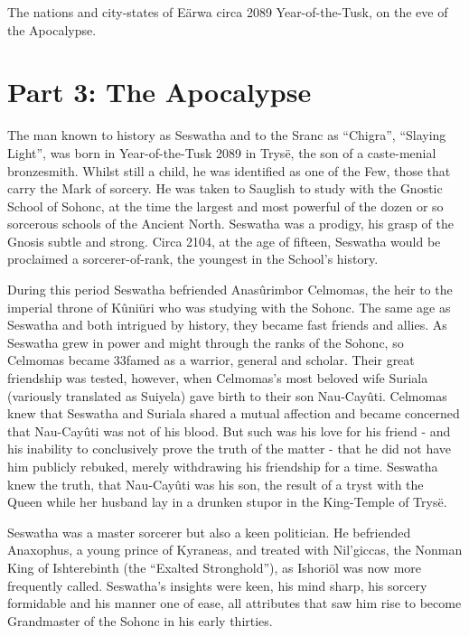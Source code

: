 \documentclass[]{book}
\begin{document}
The nations and city-states of Eärwa circa 2089 Year-of-the-Tusk, on the eve of the Apocalypse.

\hypertarget{part-3-the-apocalypse}{%
\chapter{Part 3: The Apocalypse}\label{part-3-the-apocalypse}}

The man known to history as Seswatha and to the Sranc as ``Chigra'', ``Slaying Light'',
was born in Year-of-the-Tusk 2089 in Trysë, the son of a caste-menial bronzesmith.
Whilst still a child, he was identified as one of the Few, those that carry the Mark of
sorcery. He was taken to Sauglish to study with the Gnostic School of Sohonc, at the
time the largest and most powerful of the dozen or so sorcerous schools of the Ancient
North. Seswatha was a prodigy, his grasp of the Gnosis subtle and strong. Circa 2104,
at the age of fifteen, Seswatha would be proclaimed a sorcerer-of-rank, the youngest in
the School's history.

During this period Seswatha befriended Anasûrimbor Celmomas, the heir to the
imperial throne of Kûniüri who was studying with the Sohonc. The same age as
Seswatha and both intrigued by history, they became fast friends and allies. As Seswatha
grew in power and might through the ranks of the Sohonc, so Celmomas became
33famed as a warrior, general and scholar. Their great friendship was tested, however,
when Celmomas's most beloved wife Suriala (variously translated as Suiyela) gave birth
to their son Nau-Cayûti. Celmomas knew that Seswatha and Suriala shared a mutual
affection and became concerned that Nau-Cayûti was not of his blood. But such was his
love for his friend - and his inability to conclusively prove the truth of the matter - that
he did not have him publicly rebuked, merely withdrawing his friendship for a time.
Seswatha knew the truth, that Nau-Cayûti was his son, the result of a tryst with the
Queen while her husband lay in a drunken stupor in the King-Temple of Trysë.

Seswatha was a master sorcerer but also a keen politician. He befriended Anaxophus, a
young prince of Kyraneas, and treated with Nil'giccas, the Nonman King of
Ishterebinth (the ``Exalted Stronghold''), as Ishoriöl was now more frequently called.
Seswatha's insights were keen, his mind sharp, his sorcery formidable and his manner
one of ease, all attributes that saw him rise to become Grandmaster of the Sohonc in
his early thirties.
\end{document}
